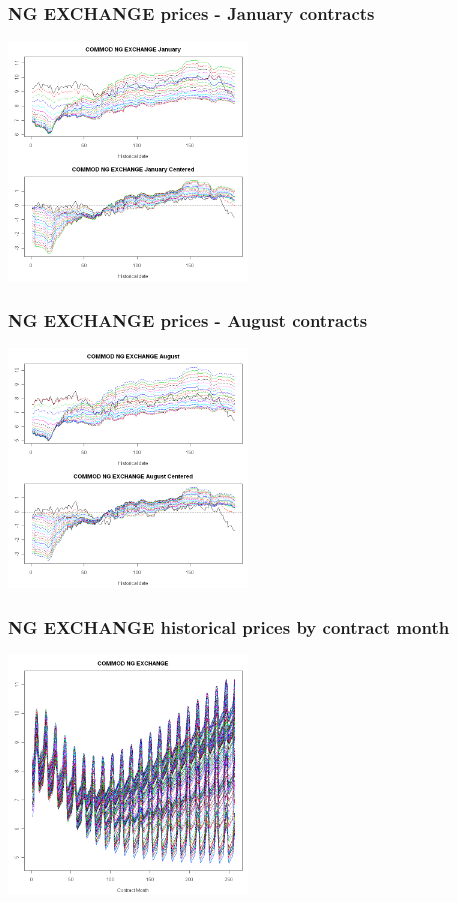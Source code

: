 \documentclass[10pt]{beamer}
\begin{document}
\frame
{
  \frametitle{NG EXCHANGE  prices - January contracts} 
\begin{center}
  \includegraphics[height=2.5in]{figures/henry02.png}
\end{center}
}

\frame
{
  \frametitle{NG EXCHANGE  prices - August contracts} 
\begin{center}
  \includegraphics[height=2.5in]{figures/henry03.png}
\end{center}
}

\frame
{
  \frametitle{NG EXCHANGE historical prices by contract month } 
\begin{center}
  \includegraphics[height=2.5in]{figures/henry04.png}
\end{center}
}
\end{document}

